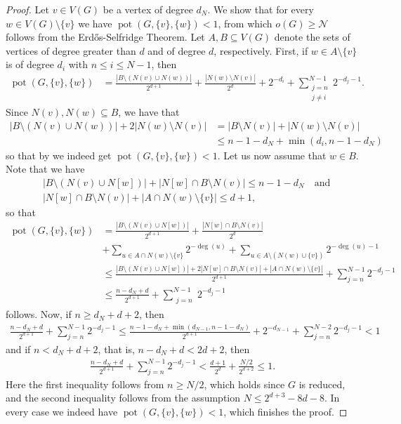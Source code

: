 \documentclass[a4paper,11pt,oneside]{scrartcl}
\theoremstyle{definition}
\theoremstyle{remark}
\DeclareMathOperator{\pot}{pot}
\begin{document}
\begin{proof}
    Let $v \in V(G)$ be a vertex of degree $d_N$. We show that for every $w \in V(G) \setminus \{v\}$ we have $\pot(G, \{v\}, \{w\}) < 1$, from which $o(G) \geq \mathcal N$ follows from the Erd\H{o}s-Selfridge Theorem. Let $A,B \subseteq V(G)$ denote the sets of vertices of degree greater than $d$ and of degree $d$, respectively. First, if $w \in A \setminus \{v\}$ is of degree $d_i$ with $n \leq i \leq N-1$, then
    \begin{align*}
        \pot(G, \{v\}, \{w\}) &= \frac{|B \setminus (N(v) \cup N(w))|}{2^{d+1}}+\frac{|N(w) \setminus N(v)|}{2^{d}}+ 2^{-d_i} + \sum_{\substack{j = n \\ j \neq i}}^{N-1} 2^{-d_j - 1}.
    \end{align*}
    Since $N(v), N(w) \subseteq B$, we have that 
    \begin{align*}
        |B \setminus (N(v) \cup N(w))| + 2|N(w) \setminus N(v)| &= |B \setminus N(v)| + |N(w) \setminus N(v)| \\
        &\leq n-1-d_N + \min(d_i, n-1 - d_N)
    \end{align*}
    so that by  we indeed get $\pot(G,\{v\}, \{w\}) < 1$. Let us now assume that $w \in B$. Note that we have 
    \begin{align*}
        &|B \setminus (N(v) \cup N[w])| + |N[w] \cap B \setminus N(v)| \leq n-1-d_N \quad \text{and}  \\
        &|N[w] \cap B \setminus N(v)|+ |A \cap N(w) \setminus \{v\}| \leq d+1,
    \end{align*}
    so that
    \begin{align*}
        \pot(G, \{v\}, \{w\}) &= \frac{|B \setminus (N(v) \cup N[w])|}{2^{d+1}} + \frac{|N[w] \cap B \setminus N(v)|}{2^d}\\ 
        &+ \sum_{u \in A \cap N(w) \setminus \{v\}} 2^{-\deg(u)} + \sum_{u \in A \setminus (N(w) \cup \{v\})} 2^{-\deg(u) - 1}\\
        &\leq \frac{|B \setminus (N(v) \cup N[w])| + 2|N[w] \cap B \setminus N(v)| + |A \cap N(w) \setminus \{v\}|}{2^{d+1}}+ \sum_{j = n}^{N-1} 2^{-d_j - 1}\\
        &\leq \frac{n-d_N+d}{2^{d+1}} + \sum_{\substack{j = n}}^{N-1} 2^{-d_j - 1}
    \end{align*}
    follows.
    Now, if $n \geq d_N + d + 2$, then 
    \begin{align*}
        \frac{n-d_N+d}{2^{d+1}} + \sum_{j = n}^{N-1} 2^{-d_j - 1} \leq \frac{n-1-d_N+\min(d_{N-1}, n - 1 - d_N)}{2^{d+1}}+ 2^{-d_{N-1}} + \sum_{j=n}^{N-2} 2^{-d_j - 1} < 1
    \end{align*}
    and if $n < d_N + d + 2$, that is, $n - d_N + d < 2d+2$, then
    \begin{align*}
        \frac{n-d_N+d}{2^{d+1}} + \sum_{j = n}^{N-1} 2^{-d_j - 1} < \frac{d+1}{2^{d}} + \frac{N/2}{2^{d+2}} \leq 1.
    \end{align*}
    Here the first inequality follows from $n \geq N/2$, which holds since $G$ is reduced, and the second inequality follows from the assumption $N\leq 2^{d+3} - 8d - 8$. In every case we indeed have $\pot(G,\{v\}, \{w\}) < 1$, which finishes the proof.
\end{proof}
\end{document}
